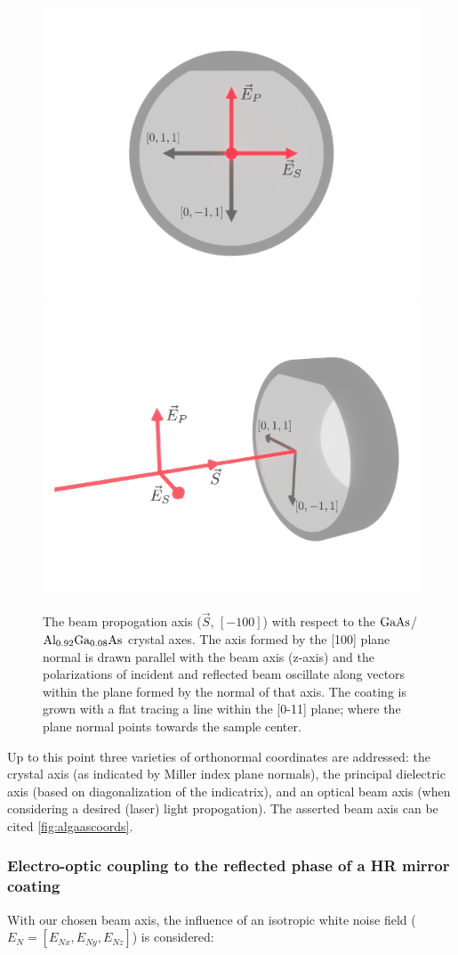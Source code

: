 \begin{figure}[!hb]
    \begin{subcaptiongroup}
	    \includegraphics[width=.5\textwidth]{figs/ALGAAS/coating_orientation_normal.pdf}
	    \label{conormal}
	    \includegraphics[width=.5\textwidth]{figs/ALGAAS/coating_orientation_isometric.pdf}
	    \label{coiso}
    \end{subcaptiongroup}
\caption{The beam propogation axis ($\vec{S}$, $[-100]$) with respect to the $\mathrm{GaAs}$/$\mathrm{Al_{0.92}Ga_{0.08}As}$ crystal axes. The axis formed by the [100] plane normal is drawn parallel with the beam axis (z-axis) and the polarizations of incident and reflected beam oscillate along vectors within the plane formed by the normal of that axis. The coating is grown with a flat tracing a line within the [0-11] plane; where the plane normal points towards the sample center.}
\label{fig:algaascoords}
\end{figure}

Up to this point three varieties of orthonormal coordinates are addressed: the crystal axis (as indicated by Miller index plane normals), the principal dielectric axis (based on diagonalization of the indicatrix), and an optical beam axis (when considering a desired (laser) light propogation). The asserted beam axis can be cited \autoref{fig:algaascoords}.

\subsubsection{Electro-optic coupling to the reflected phase of a HR mirror coating}
With our chosen beam axis, the influence of an isotropic white noise field ($E_N = [E_{Nx},E_{Ny},E_{Nz}]$) is considered:

